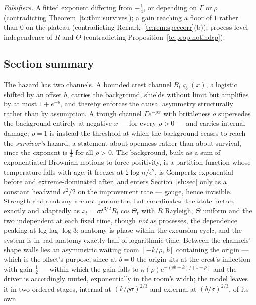 \documentclass[11pt]{article}
\numberwithin{equation}{section}
\theoremstyle{plain}
\theoremstyle{definition}
\theoremstyle{remark}
\begin{document}
\emph{Falsifiers.} A fitted exponent differing from $-\tfrac14$, or
depending on $\Gamma$ or $\rho$ (contradicting
Theorem~\ref{tc:thm:survives}); a gain reaching a floor of $1$ rather
than $0$ on the plateau (contradicting
Remark~\ref{tc:rem:speccorr}(b)); process-level independence of $R$ and
$\Theta$ (contradicting Proposition~\ref{tc:prop:notindep}).

\subsection*{Section summary}

The hazard has two channels. A bounded crest channel
$B_t\varsigma_b(x)$, a logistic shifted by an offset $b$, carries the
background, shields without limit but amplifies by at most $1+e^{-b}$,
and thereby enforces the causal asymmetry structurally rather than by
assumption. A trough channel $\Gamma e^{-\rho x}$ with brittleness
$\rho$ supersedes the background entirely at negative $x$ --- for every
$\rho>0$ --- and carries internal damage; $\rho=1$ is instead the
threshold at which the background ceases to reach the \emph{survivor's}
hazard, a statement about openness rather than about survival, since the
exponent is $\tfrac14$ for all $\rho>0$. The background,
built as a sum of exponentiated Brownian motions to force positivity, is
a partition function whose temperature falls with age: it freezes at
$2\log n/\epsilon^{2}$, is Gompertz-exponential before and
extreme-dominated after, and enters Section~\ref{sh:sec} only as a constant
headwind $\epsilon^{2}/2$ on the improvement rate --- gauge, hence
invisible. Strength and anatomy are not parameters but coordinates: the
state factors exactly and adaptedly as $x_t=\sigma t^{3/2}R_t\cos
\Theta_t$ with $R$ Rayleigh, $\Theta$ uniform and the two independent at
each fixed time, though \emph{not} as processes, the dependence peaking
at log-lag $\log3$; anatomy is phase within the excursion cycle, and the
system is in bad anatomy exactly half of logarithmic time. Between the
channels' shape walls lies an asymmetric waiting room $[-k/\rho,\,b]$
containing the origin --- which is the offset's purpose, since at $b=0$
the origin sits at the crest's inflection with gain $\tfrac12$ ---
within which the gain falls to $\kappa(\rho)e^{-(\rho b+k)/(1+\rho)}$
and the driver is accordingly muted, exponentially in the room's width;
the model leaves it in two ordered stages, internal at
$(k/\rho\sigma)^{2/3}$ and external at $(b/\sigma)^{2/3}$, of its own
\end{document}
